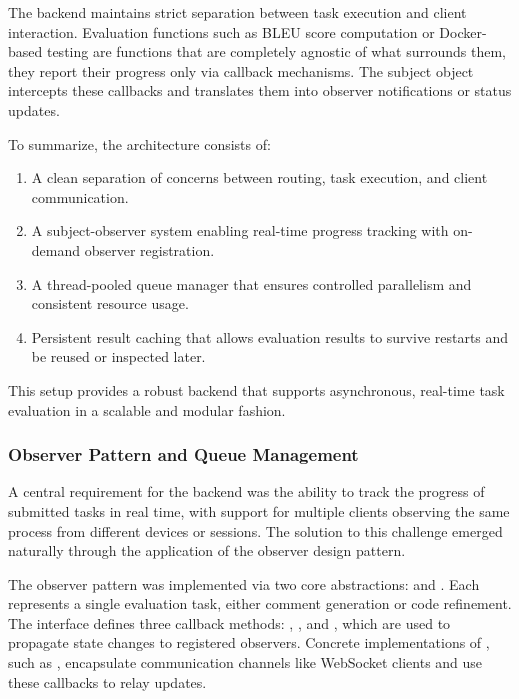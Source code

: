 The backend maintains strict separation between task execution and client interaction. Evaluation
functions such as BLEU score computation or Docker-based testing are functions that are completely
agnostic of what surrounds them, they report their progress only via callback mechanisms. The
subject object intercepts these callbacks and translates them into observer notifications or status
updates.

To summarize, the architecture consists of:
\begin{enumerate}
	\item A clean separation of concerns between routing, task execution, and client communication.
	\item A subject-observer system enabling real-time progress tracking with on-demand observer
	      registration.
	\item A thread-pooled queue manager that ensures controlled parallelism and consistent resource
	      usage.
	\item Persistent result caching that allows evaluation results to survive restarts and be reused
	      or inspected later.
\end{enumerate}

This setup provides a robust backend that supports asynchronous, real-time task evaluation in a
scalable and modular fashion.


\subsubsection{Observer Pattern and Queue Management}
\label{sec:observer}

A central requirement for the backend was the ability to track the progress of submitted tasks in
real time, with support for multiple clients observing the same process from different devices or
sessions. The solution to this challenge emerged naturally through the application of the observer
design pattern.

The observer pattern was implemented via two core abstractions:  and
. Each  represents a single evaluation task, either comment
generation or code refinement. The  interface defines three callback
methods: , , and , which are
used to propagate state changes to registered observers. Concrete implementations of
, such as , encapsulate communication channels like
WebSocket clients and use these callbacks to relay updates.


